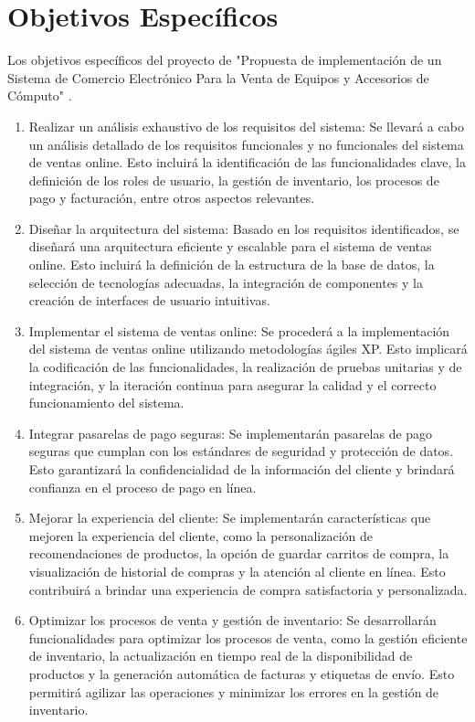 \documentclass[12pt,a4paper]{article}
\newcommand{\newsection}[1]{\section{\hspace{6mm} #1}}%
\newcommand{\titulo}{"Propuesta de implementación de un Sistema de Comercio Electrónico Para la Venta de Equipos y Accesorios de Cómputo" }
\begin{document}
\newpage
\newsection{Objetivos Específicos}
Los objetivos específicos del proyecto de \titulo.%
\begin{enumerate}
\item Realizar un análisis exhaustivo de los requisitos del sistema: Se llevará a cabo un análisis detallado de los requisitos funcionales y no funcionales del sistema de ventas online. Esto incluirá la identificación de las funcionalidades clave, la definición de los roles de usuario, la gestión de inventario, los procesos de pago y facturación, entre otros aspectos relevantes.
\item Diseñar la arquitectura del sistema: Basado en los requisitos identificados, se diseñará una arquitectura eficiente y escalable para el sistema de ventas online. Esto incluirá la definición de la estructura de la base de datos, la selección de tecnologías adecuadas, la integración de componentes y la creación de interfaces de usuario intuitivas.
\item Implementar el sistema de ventas online: Se procederá a la implementación del sistema de ventas online utilizando metodologías ágiles XP. Esto implicará la codificación de las funcionalidades, la realización de pruebas unitarias y de integración, y la iteración continua para asegurar la calidad y el correcto funcionamiento del sistema.
\item Integrar pasarelas de pago seguras: Se implementarán pasarelas de pago seguras que cumplan con los estándares de seguridad y protección de datos. Esto garantizará la confidencialidad de la información del cliente y brindará confianza en el proceso de pago en línea.
\item Mejorar la experiencia del cliente: Se implementarán características que mejoren la experiencia del cliente, como la personalización de recomendaciones de productos, la opción de guardar carritos de compra, la visualización de historial de compras y la atención al cliente en línea. Esto contribuirá a brindar una experiencia de compra satisfactoria y personalizada.
\item Optimizar los procesos de venta y gestión de inventario: Se desarrollarán funcionalidades para optimizar los procesos de venta, como la gestión eficiente de inventario, la actualización en tiempo real de la disponibilidad de productos y la generación automática de facturas y etiquetas de envío. Esto permitirá agilizar las operaciones y minimizar los errores en la gestión de inventario.

\end{enumerate}
\end{document}
